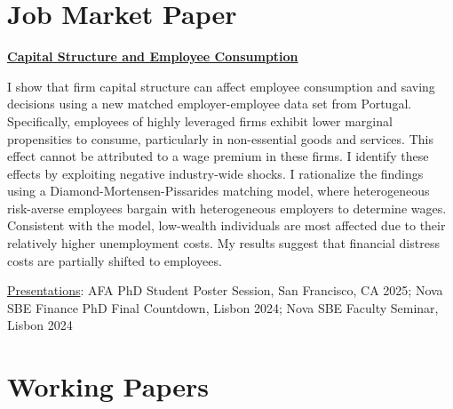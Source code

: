 \documentclass[letterpaper]{article}
\newenvironment{itemize*}{
  \begin{list}{}{
    \setlength{\leftmargin}{1.5em}
  }
}{
  \end{list}
}
\begin{document}
\section*{Job Market Paper}
\vspace{-0.2in}
\hrulefill
\begin{itemize*}
\item \href{https://miguelcfoliveira.github.io/Papers/Homemade_Unleverage.pdf}{\color{blue}\textbf{Capital Structure and Employee Consumption}}
\item I show that firm capital structure can affect employee consumption and saving decisions using a new matched employer-employee data set from Portugal. Specifically, employees of highly leveraged firms exhibit lower marginal propensities to consume, particularly in non-essential goods and services. This effect cannot be attributed to a wage premium in these firms. I identify these effects by exploiting negative industry-wide shocks. I rationalize the findings using a Diamond-Mortensen-Pissarides matching model, where heterogeneous risk-averse employees bargain with heterogeneous employers to determine wages. Consistent with the model, low-wealth individuals are most affected due to their relatively higher unemployment costs. My results suggest that financial distress costs are partially shifted to employees.

\underline{Presentations}: AFA PhD Student Poster Session, San Francisco, CA 2025; Nova SBE Finance PhD Final Countdown, Lisbon 2024; Nova SBE Faculty Seminar, Lisbon 2024
\end{itemize*}

\section*{Working Papers}
\vspace{-0.2in}
\hrulefill
\end{document}
